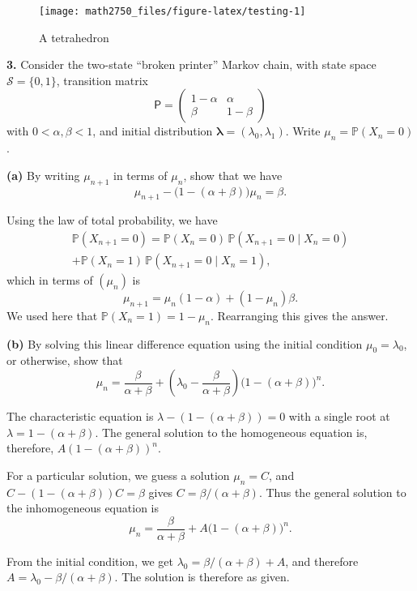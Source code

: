 \documentclass[
  a4paper,
]{article}
\theoremstyle{definition}
\theoremstyle{definition}
\theoremstyle{definition}
\theoremstyle{remark}
\begin{document}
\begin{figure}

{\centering \texttt{[image: math2750\_files/figure-latex/testing-1]} 

}

\caption{A tetrahedron}\label{fig:testing}
\end{figure}

\textbf{3.} Consider the two-state ``broken printer'' Markov chain, with state space \(\mathcal S = \{0,1\}\), transition matrix
\[ \mathsf P = \begin{pmatrix} 1-\alpha & \alpha \\
                 \beta & 1-\beta \end{pmatrix} \]
with \(0 < \alpha, \beta < 1\), and initial distribution \(\boldsymbol\lambda = (\lambda_0, \lambda_1)\). Write \(\mu_n =\mathbb P(X_n = 0)\).

\textbf{(a)} By writing \(\mu_{n+1}\) in terms of \(\mu_n\), show that we have
\[ \mu_{n+1} - \big(1-(\alpha+\beta)\big)\mu_n = \beta . \]

\begin{myanswers}

Using the law of total probability, we have
\begin{multline*}
\mathbb P(X_{n+1} = 0) = \mathbb P(X_n = 0)\,\mathbb P(X_{n+1} = 0 \mid X_n = 0) \\
+ \mathbb P(X_n = 1)\,\mathbb P(X_{n+1} = 0 \mid X_n = 1) ,
\end{multline*}
which in terms of \((\mu_n)\) is
\[ \mu_{n+1} = \mu_n (1-\alpha) + (1 - \mu_n)\beta . \]
We used here that \(\mathbb P(X_n = 1) = 1-\mu_n\).
Rearranging this gives the answer.

\end{myanswers}

\textbf{(b)} By solving this linear difference equation using the initial condition \(\mu_0 = \lambda_0\), or otherwise, show that
\[ \mu_n = \frac{\beta}{\alpha+\beta} + \left(\lambda_0 - \frac{\beta}{\alpha+\beta}\right)\big(1-(\alpha+\beta)\big)^n   . \]

\begin{myanswers}

The characteristic equation is \(\lambda - (1-(\alpha+\beta)) = 0\) with a single root at \(\lambda = 1 - (\alpha+\beta)\). The general solution to the homogeneous equation is, therefore, \(A(1-(\alpha+\beta))^n\).

For a particular solution, we guess a solution \(\mu_n = C\), and \(C - (1-(\alpha+\beta))C = \beta\) gives \(C = \beta/(\alpha+\beta)\). Thus the general solution to the inhomogeneous equation is
\[ \mu_n = \frac{\beta}{\alpha+\beta} + A\big(1-(\alpha+\beta)\big)^n .\]

From the initial condition, we get \(\lambda_0 = \beta/(\alpha+\beta) + A\), and therefore \(A = \lambda_0 - \beta/(\alpha+\beta)\). The solution is therefore as given.

\end{myanswers}
\end{document}
